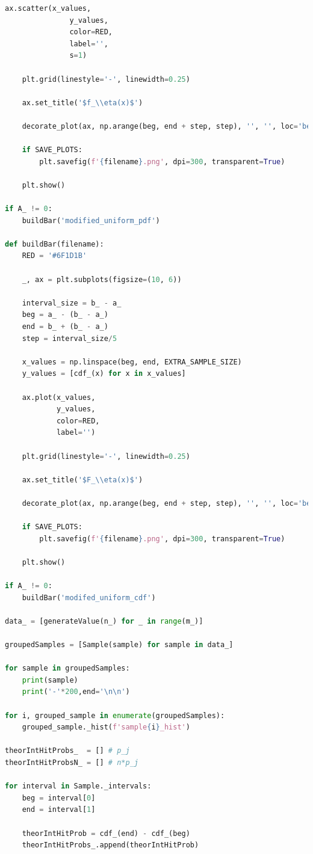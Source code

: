 \documentclass[a4paper, 14pt]{extarticle}
\begin{document}
\begin{center}
\begin{lstlisting}[language=Python]
    ax.scatter(x_values, 
               y_values, 
               color=RED, 
               label='',
               s=1)

    plt.grid(linestyle='-', linewidth=0.25)

    ax.set_title('$f_\\eta(x)$')

    decorate_plot(ax, np.arange(beg, end + step, step), '', '', loc='best')

    if SAVE_PLOTS:
        plt.savefig(f'{filename}.png', dpi=300, transparent=True)

    plt.show()

if A_ != 0:
    buildBar('modified_uniform_pdf')

def buildBar(filename):
    RED = '#6F1D1B'

    _, ax = plt.subplots(figsize=(10, 6))

    interval_size = b_ - a_
    beg = a_ - (b_ - a_)
    end = b_ + (b_ - a_)
    step = interval_size/5

    x_values = np.linspace(beg, end, EXTRA_SAMPLE_SIZE)
    y_values = [cdf_(x) for x in x_values]

    ax.plot(x_values, 
            y_values, 
            color=RED, 
            label='')

    plt.grid(linestyle='-', linewidth=0.25)

    ax.set_title('$F_\\eta(x)$')

    decorate_plot(ax, np.arange(beg, end + step, step), '', '', loc='best')

    if SAVE_PLOTS:
        plt.savefig(f'{filename}.png', dpi=300, transparent=True)

    plt.show()

if A_ != 0:
    buildBar('modifed_uniform_cdf')

data_ = [generateValue(n_) for _ in range(m_)]

groupedSamples = [Sample(sample) for sample in data_]

for sample in groupedSamples:
    print(sample)
    print('-'*200,end='\n\n')

for i, grouped_sample in enumerate(groupedSamples):
    grouped_sample._hist(f'sample{i}_hist')

theorIntHitProbs_  = [] # p_j
theorIntHitProbsN_ = [] # n*p_j

for interval in Sample._intervals:
    beg = interval[0]
    end = interval[1]

    theorIntHitProb = cdf_(end) - cdf_(beg)
    theorIntHitProbs_.append(theorIntHitProb)


\end{lstlisting}
\end{center}
\end{document}
